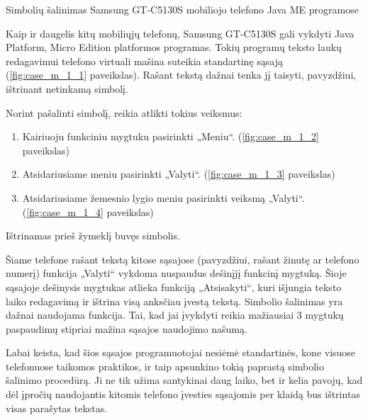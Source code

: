\begin{xcase}{Simbolių šalinimas Samsung GT-C5130S mobiliojo telefono
              Java ME programose}
  \xcgoal
  {
    Kaip ir daugelis kitų mobiliųjų telefonų, Samsung GT-C5130S gali vykdyti
    Java Platform, Micro Edition platformos programas. Tokių programų
    teksto laukų redagavimui telefono virtuali mašina suteikia standartinę
    sąsają (\ref{fig:case_m_1_1} paveikslas). Rašant tekstą dažnai tenka jį
    taisyti, pavyzdžiui, ištrinant  netinkamą simbolį.

  }
  
  \xctools
  {
    Norint pašalinti simbolį, reikia atlikti tokius veiksmus:
    \begin{enumerate}
      \item Kairiuoju funkciniu mygtuku pasirinkti „Meniu“.
        (\ref{fig:case_m_1_2} paveikslas)
      \item Atsidariusiame meniu pasirinkti „Valyti“.
        (\ref{fig:case_m_1_3} paveikslas)
      \item Atsidariusiame žemesnio lygio meniu pasirinkti veiksmą „Valyti“.
        (\ref{fig:case_m_1_4} paveikslas)
    \end{enumerate}

    {
    }
  }
  
  \xcresult
  {
    Ištrinamas prieš žymeklį buvęs simbolis.
  }
  
  \xcprinciples
  {
    {
      Šiame telefone rašant tekstą kitose sąsajose (pavyzdžiui, rašant
      žinutę ar telefono numerį) funkcija „Valyti“ vykdoma nuspaudus
      dešinįjį funkcinį mygtuką. Šioje sąsajoje dešinysis mygtukas atlieka
      funkciją „Atsisakyti“, kuri išjungia teksto laiko redagavimą ir
      ištrina visą anksčiau įvestą tekstą.
    }
    {
      Simbolio šalinimas yra dažnai naudojama funkcija. Tai, kad jai
      įvykdyti reikia mažiausiai 3 mygtukų paspaudimų stipriai mažina
      sąsajos naudojimo našumą.
    }
  }
  
  \xcthoughts
  {
    Labai keista, kad šios sąsajos programuotojai nesiėmė standartinės, kone
    visuose telefonuose taikomos praktikos, ir taip apsunkino tokią paprastą
    simbolio šalinimo procedūrą. Ji ne tik užima santykinai daug laiko, bet
    ir kelia pavojų, kad dėl įpročių naudojantis kitomis telefono įvesties
    sąsajomis per klaidą bus ištrintas visas parašytas tekstas.
  }
\end{xcase}
